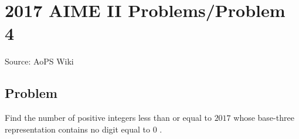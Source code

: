\documentclass[12pt]{article}
\begin{document}
\section*{{2017 AIME II Problems/Problem 4}}
Source: AoPS Wiki

\subsection*{Problem}
Find the number of positive integers less than or equal to $2017$ whose base-three representation contains no digit equal to $0$ .
\end{document}
